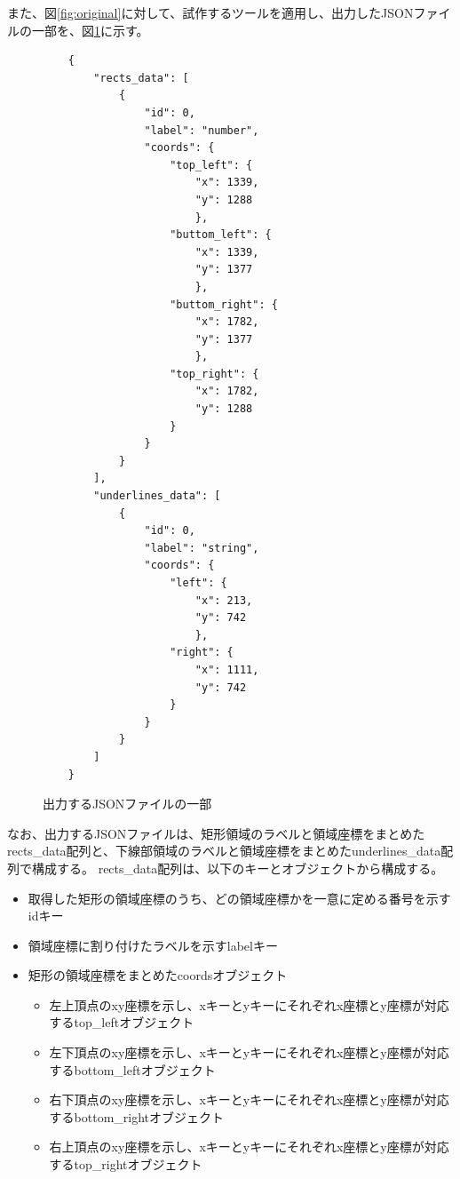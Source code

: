 また、図\ref{fig:original}に対して、試作するツールを適用し、出力したJSONファイルの一部を、図\ref{fig:example_output_json}に示す。
\lstset{language=}
\begin{figure}[tp]
    \begin{lstlisting}
    {
        "rects_data": [
            {
                "id": 0, 
                "label": "number",
                "coords": {
                    "top_left": {
                        "x": 1339,
                        "y": 1288
                        },
                    "buttom_left": {
                        "x": 1339,
                        "y": 1377
                        },
                    "buttom_right": {
                        "x": 1782,
                        "y": 1377
                        },
                    "top_right": {
                        "x": 1782,
                        "y": 1288
                    }
                }
            }
        ],
        "underlines_data": [
            {
                "id": 0,
                "label": "string",
                "coords": {
                    "left": {
                        "x": 213,
                        "y": 742
                        },
                    "right": {
                        "x": 1111,
                        "y": 742
                    }
                }
            }
        ]
    }
    \end{lstlisting}
    \caption{出力するJSONファイルの一部}\label{fig:example_output_json}
\end{figure}

なお、出力するJSONファイルは、矩形領域のラベルと領域座標をまとめたrects\_data配列と、下線部領域のラベルと領域座標をまとめたunderlines\_data配列で構成する。
rects\_data配列は、以下のキーとオブジェクトから構成する。

\begin{itemize}
    \item 取得した矩形の領域座標のうち、どの領域座標かを一意に定める番号を示すidキー
    \item 領域座標に割り付けたラベルを示すlabelキー
    \item 矩形の領域座標をまとめたcoordsオブジェクト
    \begin{itemize}
        \item 左上頂点のxy座標を示し、xキーとyキーにそれぞれx座標とy座標が対応するtop\_leftオブジェクト
        \item 左下頂点のxy座標を示し、xキーとyキーにそれぞれx座標とy座標が対応するbottom\_leftオブジェクト
        \item 右下頂点のxy座標を示し、xキーとyキーにそれぞれx座標とy座標が対応するbottom\_rightオブジェクト
        \item 右上頂点のxy座標を示し、xキーとyキーにそれぞれx座標とy座標が対応するtop\_rightオブジェクト
    \end{itemize}
\end{itemize}

